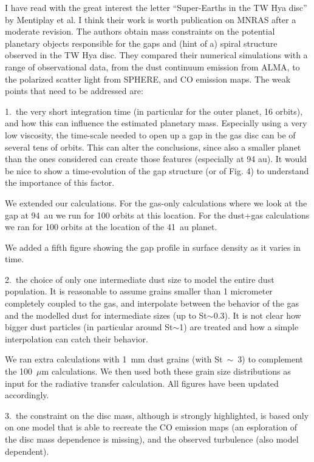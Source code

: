 \documentclass{article}
\begin{document}
I have read with the great interest the letter ``Super-Earths in the TW Hya
disc'' by Mentiplay et al.  I think their work is worth publication on MNRAS
after a moderate revision.  The authors obtain mass constraints on the potential
planetary objects responsible for the gaps and (hint of a) spiral structure
observed in the TW Hya disc.  They compared their numerical simulations with a
range of observational data, from the dust continuum emission from ALMA, to the
polarized scatter light from SPHERE, and CO emission maps.  The weak points that
need to be addressed are:

1.\ the very short integration time (in particular for the outer planet, 16
orbits), and how this can influence the estimated planetary mass.  Especially
using a very low viscosity, the time-scale needed to open up a gap in the gas
disc can be of several tens of orbits. This can alter the conclusions, since
also a smaller planet than the ones considered can create those features
(especially at 94 au). It would be nice to show a time-evolution of the gap
structure (or of Fig. 4) to understand the importance of this factor.

{\color{blue}
   We extended our calculations. For the gas-only calculations where we look at
   the gap at 94~au we run for 100 orbits at this location. For the dust+gas
   calculations we ran for 100 orbits at the location of the 41~au planet.

   We added a fifth figure showing the gap profile in surface density as it
   varies in time.
}

2.\ the choice of only one intermediate dust size to model the entire dust
population.  It is reasonable to assume grains smaller than 1 micrometer
completely coupled to the gas, and interpolate between the behavior of the gas
and the modelled dust for intermediate sizes (up to St$\sim$0.3). It is not
clear how bigger dust particles (in particular around St$\sim$1) are treated and
how a simple interpolation can catch their behavior.

{\color{blue}
   We ran extra calculations with 1~mm dust grains (with St~$\sim$~3) to
   complement the 100~$\mu$m calculations. We then used both these grain size
   distributions as input for the radiative transfer calculation. All figures
   have been updated accordingly.
}

3.\ the constraint on the disc mass, although is strongly highlighted, is based
only on one model that is able to recreate the CO emission maps (an esploration
of the disc mass dependence is missing), and the observed turbulence (also model
dependent).
\end{document}
